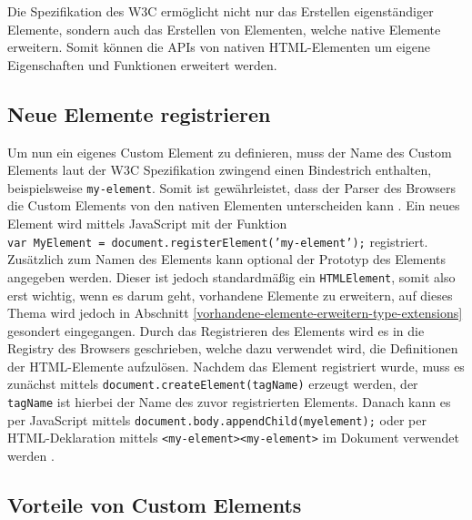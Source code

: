 

Die Spezifikation des \ac{W3C} ermöglicht nicht nur das Erstellen eigenständiger Elemente, sondern auch das Erstellen von Elementen, welche native Elemente erweitern. Somit können die \ac{API}s von nativen \ac{HTML}-Elementen um eigene Eigenschaften und Funktionen erweitert werden.


\subsection{Neue Elemente registrieren}\label{neue-elemente-registrieren}

Um nun ein eigenes Custom Element zu definieren, muss der Name des Custom Elements laut der \ac{W3C} Spezifikation zwingend einen Bindestrich enthalten, beispielsweise \texttt{my-element}. Somit ist gewährleistet, dass der Parser des Browsers die Custom Elements von den nativen Elementen unterscheiden kann \cite{citeulike:13845061}. Ein neues Element wird mittels JavaScript mit der Funktion \texttt{var\ MyElement\ =\ document.registerElement('my-element');} registriert. Zusätzlich zum Namen des Elements kann optional der Prototyp des Elements angegeben werden. Dieser ist jedoch standardmäßig ein \texttt{HTMLElement}, somit also erst wichtig, wenn es darum geht, vorhandene Elemente zu erweitern, auf dieses Thema wird jedoch in Abschnitt \ref{vorhandene-elemente-erweitern-type-extensions} gesondert eingegangen. Durch das Registrieren des Elements wird es in die Registry des Browsers geschrieben, welche dazu verwendet wird, die Definitionen der \ac{HTML}-Elemente aufzulösen. Nachdem das Element registriert wurde, muss es zunächst mittels \texttt{document.createElement(tagName)} erzeugt werden, der \texttt{tagName} ist hierbei der Name des zuvor registrierten Elements. Danach kann es per JavaScript mittels \texttt{document.body.appendChild(myelement);} oder per \ac{HTML}-Deklaration mittels \texttt{\textless{}my-element\textgreater{}\textless{}my-element\textgreater{}} im Dokument verwendet werden \cite[S. 127-138]{citeulike:13844975}.


\subsection{Vorteile von Custom Elements}\label{vorteile-von-custom-elements}

